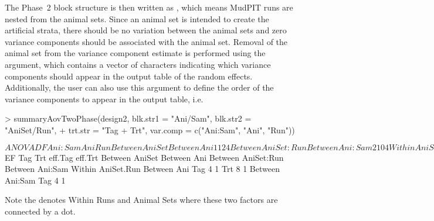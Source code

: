 \documentclass[article]{jss}
\begin{document}
The Phase~2 block structure is then written as , which means MudPIT runs are nested from the animal sets. Since an animal set is intended to create the artificial strata, there should be no variation between the animal sets and zero variance components should be associated with the animal set. Removal of the animal set from the variance component estimate is performed using the  argument, which contains a vector of characters indicating which variance components should appear in the output table of the random effects. Additionally, the user can also use this argument to define the order of the variance components to appear in the output table, i.e.
\begin{CodeChunk}
\begin{CodeInput}
> summaryAovTwoPhase(design2, blk.str1 = "Ani/Sam", blk.str2 = "AniSet/Run", 
+	trt.str = "Tag + Trt", var.comp = c("Ani:Sam", "Ani", "Run"))                                    
\end{CodeInput}
\begin{CodeOutput}
$ANOVA
                   DF Ani:Sam Ani Run
Between AniSet                       
   Between Ani     1  1       2   4  
Between AniSet:Run                   
   Between Ani:Sam 2  1       0   4  
Within AniSet.Run                    
   Between Ani                       
      Tag          1  1       2   0  
      Trt          1  1       2   0  
      Residual     4  1       2   0  
   Between Ani:Sam                   
      Tag          2  1       0   0  
      Residual     4  1       0   0  

$EF
                   Tag Trt eff.Tag eff.Trt
Between AniSet                            
   Between Ani                            
Between AniSet:Run                        
   Between Ani:Sam                        
Within AniSet.Run                         
   Between Ani                            
      Tag          4       1              
      Trt              8           1      
   Between Ani:Sam                        
      Tag          4       1              
\end{CodeOutput}
\end{CodeChunk}
Note the  denotes Within Runs and Animal Sets where these two factors are connected by a dot.  
\end{document}
